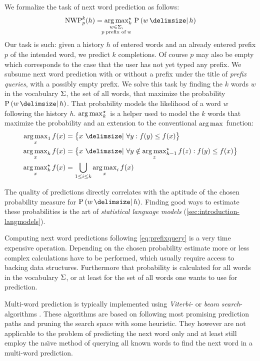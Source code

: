 We formalize the task of next word prediction as follows:
\begin{equation}
  \label{eq:prefixquery}
  \NWP[p][k]{h} =
    \Argmax*[k]{\mathclap{\substack{w \in \Vocab,\\p \: \text{prefix of} \: w}}}
      \Prob{w}{h}
\end{equation}
Our task is such: given a history $h$ of entered words and an already entered
prefix $p$ of the intended word, we predict $k$ completions.
Of course $p$ may also be empty which corresponds to the case that the user has
not yet typed any prefix.
We subsume next word prediction with or without a prefix under the title of
\emph{prefix queries}, with a possibly empty prefix.
We solve this task by finding the $k$ words $w$ in the vocabulary $\Sigma$, the
set of all words, that maximize the probability $\Prob{w}{h}$.
That probability models the likelihood of a word $w$ following the history $h$.
$\Argmax*[k]$ is a helper used to model the $k$ words that maximize the
probability and an extension to the conventional $\Argmax$ function:
\begin{subequations}
  \begin{align}
    \Argmax [1]{x} f(x) &= \big\{ x \,\Given\, \forall y : f(y) \leq f(x) \big\} \\
    \Argmax [k]{x} f(x) &= \big\{ x \,\Given\, \forall y \notin \Argmax*[k-1]{z} f(z) : f(y) \leq f(x) \big\} \\
    \Argmax*[k]{x} f(x) &= \bigcup_{{1 \leq i \leq k}} \Argmax[i]{x} f(x)
  \end{align}
\end{subequations}

The quality of predictions directly correlates with the aptitude of the chosen
probability measure for $\Prob{w}{h}$.
Finding good ways to estimate these probabilities is the art of
\emph{statistical language models} (\cref{sec:introduction-langmodels}).

Computing next word predictions following \cref{eq:prefixquery} is a very time
expensive operation.
Depending on the chosen probability estimate more or less complex calculations
have to be performed, which usually require access to backing data structures.
Furthermore that probability is calculated for all words in the vocabulary
$\Sigma$, or at least for the set of all words one wants to use for prediction.

Multi-word prediction is typically implemented using \emph{Viterbi-} or
\emph{beam search}-algorithms \parencite{Bickel2005,JurafskyMartin2009}.
These algorithms are based on following most promising prediction paths and
pruning the search space with some heuristic.
They however are not applicable to the problem of predicting the next word only
and at least \textcite{Bickel2005} still employ the na\"{\i}ve method of
querying all known words to find the next word in a multi-word prediction.

